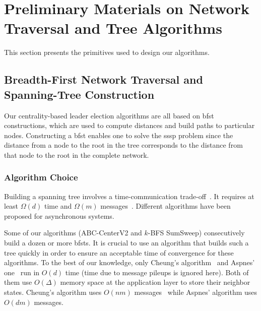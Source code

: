 \section[Preliminary Materials on Network Traversal and Tree Algorithms]{Preliminary Materials on Network Traversal and Tree Algorithms%
	}

\label{section:centrality:distributed-primitives}

This section presents the primitives used to design our algorithms.

\newcommand{\aspnesT}{ASPNES-BFS-ST-T}
\newcommand{\cheung}{CHEUNG-BFS-ST}
\newcommand{\cheungCb}{CHEUNG-BFS-ST-CB}
\newcommand{\cheungCbAgg}{CHEUNG-BFS-ST-CB-AGG}
\newcommand{\cheungIe}{LE\_CHEUNG-BFS-ST}
\newcommand{\cheungIeCb}{LE\_CHEUNG-BFS-ST-CB}
\newcommand{\cheungIeCbAgg}{LE\_CHEUNG-BFS-ST-CB\_STB-STC}

\subsection{Breadth-First Network Traversal and Spanning-Tree Construction}
\label{section:centrality:bfs}

Our centrality-based leader election algorithms are all based on \gls{bfst} constructions, which are used to compute distances and build paths to particular nodes. Constructing a \gls{bfst} enables one to solve the \gls{sssp} problem since the distance from a node to the root in the tree corresponds to the distance from that node to the root in the complete network.

\subsubsection{Algorithm Choice}

Building a spanning tree involves a time-communication trade-off~\cite{awerbuch1985distributed}. It requires at least $\Omega(d)$ time and $\Omega(m)$ messages~\cite{awerbuch1985distributed}. Different algorithms have been proposed for asynchronous systems.

Some of our algorithms (ABC-CenterV2 and $k$-BFS SumSweep) consecutively build a dozen or more \glspl{bfst}. It is crucial to use an algorithm that builds such a tree quickly in order to ensure an acceptable time of convergence for these algorithms. To the best of our knowledge, only Cheung's algorithm~\cite{cheung1983graph} and Aspnes' one~\cite{aspnesfall2017notes} run in $O(d)$ time (time due to message pileups is ignored here). Both of them use $O(\Delta)$ memory space at the application layer to store their neighbor states. Cheung's algorithm uses $O(nm)$ messages~\cite{lynch1996distributed} while Aspnes' algorithm uses $O(dm)$ messages.

